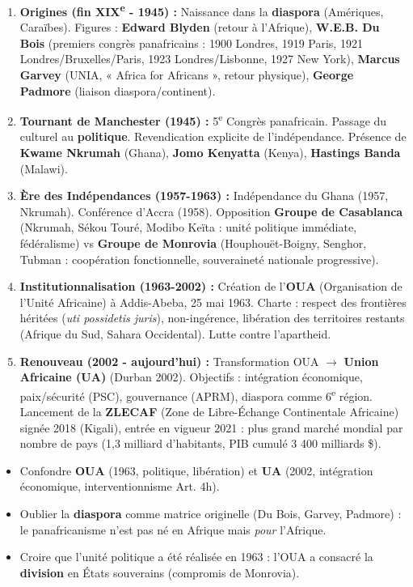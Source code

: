 \documentclass[11pt]{article}
\begin{document}
\begin{methode}
\begin{enumerate}
\item \textbf{Origines (fin XIX\textsuperscript{e} - 1945) :} Naissance dans la \textbf{diaspora} (Amériques, Caraïbes). Figures : \textbf{Edward Blyden} (retour à l'Afrique), \textbf{W.E.B. Du Bois} (premiers congrès panafricains : 1900 Londres, 1919 Paris, 1921 Londres/Bruxelles/Paris, 1923 Londres/Lisbonne, 1927 New York), \textbf{Marcus Garvey} (UNIA, « Africa for Africans », retour physique), \textbf{George Padmore} (liaison diaspora/continent).
\item \textbf{Tournant de Manchester (1945) :} 5\textsuperscript{e} Congrès panafricain. Passage du culturel au \textbf{politique}. Revendication explicite de l'indépendance. Présence de \textbf{Kwame Nkrumah} (Ghana), \textbf{Jomo Kenyatta} (Kenya), \textbf{Hastings Banda} (Malawi).
\item \textbf{Ère des Indépendances (1957-1963) :} Indépendance du Ghana (1957, Nkrumah). Conférence d'Accra (1958). Opposition \textbf{Groupe de Casablanca} (Nkrumah, Sékou Touré, Modibo Keïta : unité politique immédiate, fédéralisme) vs \textbf{Groupe de Monrovia} (Houphouët-Boigny, Senghor, Tubman : coopération fonctionnelle, souveraineté nationale progressive).
\item \textbf{Institutionnalisation (1963-2002) :} Création de l'\textbf{OUA} (Organisation de l'Unité Africaine) à Addis-Abeba, 25 mai 1963. Charte : respect des frontières héritées (\emph{uti possidetis juris}), non-ingérence, libération des territoires restants (Afrique du Sud, Sahara Occidental). Lutte contre l'apartheid.
\item \textbf{Renouveau (2002 - aujourd'hui) :} Transformation OUA $\rightarrow$ \textbf{Union Africaine (UA)} (Durban 2002). Objectifs : intégration économique, paix/sécurité (PSC), gouvernance (APRM), diaspora comme 6\textsuperscript{e} région. Lancement de la \textbf{ZLECAF} (Zone de Libre-Échange Continentale Africaine) signée 2018 (Kigali), entrée en vigueur 2021 : plus grand marché mondial par nombre de pays (1,3 milliard d'habitants, PIB cumulé 3 400 milliards \$).
\end{enumerate}
\end{methode}

\begin{attention}
\begin{itemize}
\item Confondre \textbf{OUA} (1963, politique, libération) et \textbf{UA} (2002, intégration économique, interventionnisme Art. 4h).
\item Oublier la \textbf{diaspora} comme matrice originelle (Du Bois, Garvey, Padmore) : le panafricanisme n'est pas né en Afrique mais \emph{pour} l'Afrique.
\item Croire que l'unité politique a été réalisée en 1963 : l'OUA a consacré la \textbf{division} en États souverains (compromis de Monrovia).
\end{itemize}
\end{attention}
\end{document}
